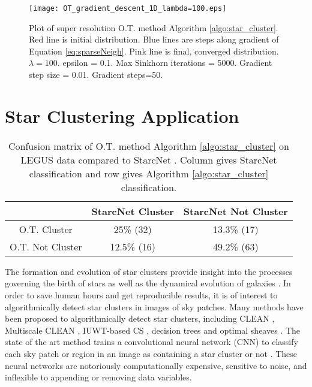 \documentclass[conference]{IEEEtran}
\begin{document}
\begin{figure}[t]
\centerline{\texttt{[image: OT\_gradient\_descent\_1D\_lambda=100.eps]}}
\caption{
Plot of super resolution O.T. method Algorithm \ref{algo:star_cluster}. Red line is initial distribution. Blue lines are steps along gradient of Equation \eqref{eq:sparseNeigh}. Pink line is final, converged distribution. $\lambda=100$.
epsilon = 0.1. Max Sinkhorn iterations = 5000. Gradient step size = 0.01. Gradient steps=50.}
\label{fig:high_sparse}
\end{figure}

\section{Star Clustering Application}\label{sec:Star}

\begin{table}[h]
\caption{Confusion matrix of O.T. method Algorithm \ref{algo:star_cluster} on LEGUS data compared to StarcNet \cite{perez}. Column gives StarcNet classification and row gives Algorithm \ref{algo:star_cluster} classification.}
\begin{center}
\begin{tabular}{c|c|c|}
 & StarcNet Cluster & StarcNet Not Cluster \\
\hline
O.T. Cluster     & 25\% (32) & 13.3\% (17)  \\
\hline
O.T. Not Cluster & 12.5\% (16) & 49.2\% (63)  \\
\hline
\end{tabular}
\label{table:2}
\end{center}
\end{table}

The formation and evolution of star clusters provide insight into the processes governing the birth of stars as well as the dynamical evolution of galaxies \cite{perez}. 
In order to save human hours and get reproducible results, it is of interest to algorithmically detect star clusters in images of sky patches. Many methods have been proposed to algorithmically detect star clusters, including CLEAN \cite{hogbom}, Multiscale CLEAN \cite{cornwell2008}, IUWT-based CS \cite{li}, decision trees \cite{grasha} and optimal sheaves \cite{robinson}. The state of the art method trains a convolutional neural network (CNN) to classify each sky patch or region in an image as containing a star cluster or not \cite{perez}. These neural networks are notoriously computationally expensive, sensitive to noise, and inflexible to appending or removing data variables. 
\end{document}
